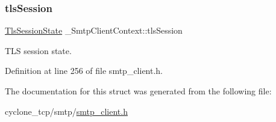 \subsubsection{\texorpdfstring{tls\+Session}{tlsSession}}
{\footnotesize\ttfamily \hyperlink{structTlsSessionState}{Tls\+Session\+State} \+\_\+\+Smtp\+Client\+Context\+::tls\+Session}



T\+LS session state. 



Definition at line 256 of file smtp\+\_\+client.\+h.



The documentation for this struct was generated from the following file\+:\begin{DoxyCompactItemize}
\item 
cyclone\+\_\+tcp/smtp/\hyperlink{smtp__client_8h}{smtp\+\_\+client.\+h}\end{DoxyCompactItemize}

